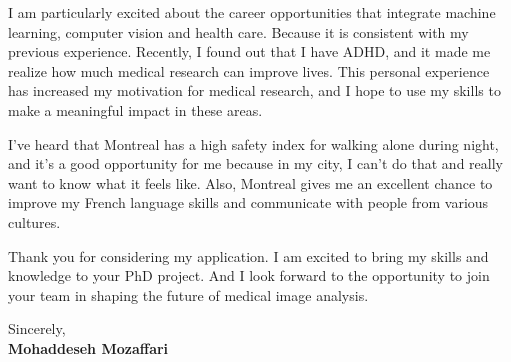 \documentclass[letterpaper,11pt]{letter}
\begin{document}
I am particularly excited about the career opportunities that integrate machine learning, computer vision and health care. Because it is consistent with my previous experience. Recently, I found out that I have ADHD, and it made me realize how much medical research can improve lives. This personal experience has increased my motivation for medical research, and I hope to use my skills to make a meaningful impact in these areas.

I've heard that Montreal has a high safety index for walking alone during night, and it's a good opportunity for me because in my city, I can't do that and really want to know what it feels like. Also, Montreal gives me an excellent chance to improve my French language skills and communicate with people from various cultures.

Thank you for considering my application. I am excited to bring my skills and knowledge to your PhD project. And I look forward to the opportunity to join your team in shaping the future of medical image analysis.


\begin{flushleft}
    Sincerely, \\
    \textbf{Mohaddeseh Mozaffari}
\end{flushleft}
\end{document}
